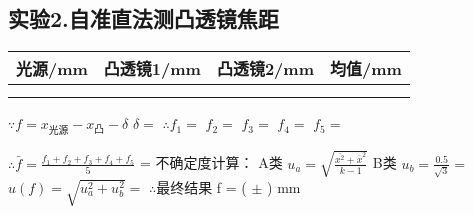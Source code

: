 \documentclass[11pt,a4paper,oneside]{article}
\begin{document}
\subsection*{实验2.自准直法测凸透镜焦距}

\begin{center}

\begin{tabular}{|c|c|c|c|}
\hline 
光源/mm &  凸透镜1/mm & 凸透镜2/mm & 均值/mm \\ 
\hline 
{%
{%
{%
{%
& %
{%
{%
\\
\hline

{%
\end{tabular}
\vspace{10pt}

\end{center}
$\because f = {x}_{\text{光源}} - {x}_{\text{凸}} - \delta$		$\delta = $ %
$\therefore {f}_1 = $%
${f}_2 = $%
${f}_3 = $%
${f}_4 = $%
${f}_5 = $%

$\therefore \bar{f} = \frac{{f}_1+{f}_2+{f}_3+{f}_4+{f}_5}{5}$ = %
不确定度计算： A类 ${u}_a = \sqrt{\frac{\bar{x^{2}} + \bar{x} ^{2}}{k-1}}$ %
             B类 ${u}_b = \frac{0.5}{\sqrt{3}} = $ %
             $u(f) = \sqrt{{u}_a ^ {2} + {u}_b ^ {2}} = $ %
             $\therefore $最终结果 f = (%
             $\pm $ %
             ) mm
\end{document}
